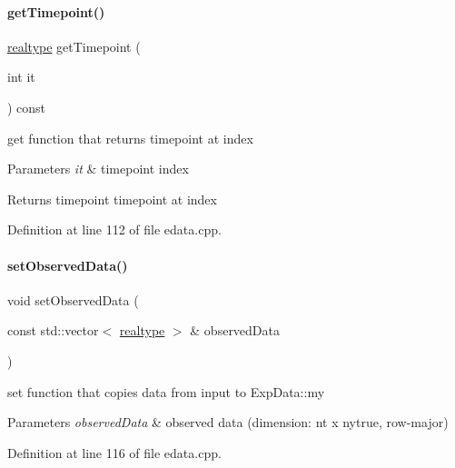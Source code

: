\paragraph{\texorpdfstring{getTimepoint()}{getTimepoint()}}
{\footnotesize\ttfamily \mbox{\hyperlink{namespaceamici_a1bdce28051d6a53868f7ccbf5f2c14a3}{realtype}} get\+Timepoint (\begin{DoxyParamCaption}\item[{int}]{it }\end{DoxyParamCaption}) const}

get function that returns timepoint at index


\begin{DoxyParams}{Parameters}
{\em it} & timepoint index \\
\hline
\end{DoxyParams}
\begin{DoxyReturn}{Returns}
timepoint timepoint at index 
\end{DoxyReturn}


Definition at line 112 of file edata.\+cpp.

\mbox{\label{classamici_1_1_exp_data_a85ca23791c279fe94e5d9f8e528ca63e}} 
\paragraph{\texorpdfstring{setObservedData()}{setObservedData()}\hspace{0.1cm}{\footnotesize\ttfamily [1/2]}}
{\footnotesize\ttfamily void set\+Observed\+Data (\begin{DoxyParamCaption}\item[{const std\+::vector$<$ \mbox{\hyperlink{namespaceamici_a1bdce28051d6a53868f7ccbf5f2c14a3}{realtype}} $>$ \&}]{observed\+Data }\end{DoxyParamCaption})}

set function that copies data from input to Exp\+Data\+::my


\begin{DoxyParams}{Parameters}
{\em observed\+Data} & observed data (dimension\+: nt x nytrue, row-\/major) \\
\hline
\end{DoxyParams}


Definition at line 116 of file edata.\+cpp.

